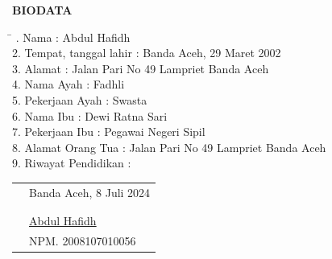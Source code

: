 
  \bigskip
  \vspace{1sp}
  \begin{center}
      \fontsize{14}{16}\selectfont
      \textup{\textbf{BIODATA}}
  \end{center}
  \vspace{2sp}

  \begin{tabbing}
    \hspace{2in} \= \hspace{2in} . Nama \> : Abdul Hafidh \\
    2. Tempat, tanggal lahir \> : Banda Aceh, 29 Maret 2002 \\
    3. Alamat \> : Jalan Pari No 49 Lampriet Banda Aceh \\
    4. Nama Ayah \> : Fadhli \\
    5. Pekerjaan Ayah \> : Swasta \\
    6. Nama Ibu \> : Dewi Ratna Sari \\
    7. Pekerjaan Ibu \> : Pegawai Negeri Sipil \\
    8. Alamat Orang Tua \> : Jalan Pari No 49 Lampriet Banda Aceh \\
    9. Riwayat Pendidikan \> : 
  \end{tabbing}

  \begin{table}[H]
  \centering
  \end{table}


  \begin{tabular}{p{7.5cm}l}
    &Banda Aceh, 8 Juli 2024\\
    &\\
    &\\
    &\multirow{1.5}{7.5cm}{\underline{Abdul Hafidh}} \\ 
    &NPM. 2008107010056 \\
  \end{tabular}

      